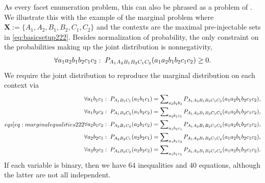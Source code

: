 {%

As every facet enumeration problem, this can also be phrased as a problem of . We illustrate this with the example of the marginal problem where $\bm{X} := \{ A_1, A_2, B_1, B_2, C_1, C_2\}$ and the contexts are the 
maximal pre-injectable sets in \cref{eq:basicsetup222}.
Besides normalization of probability, the only constraint on the probabilities making up the joint distribution is nonnegativity,
\begin{align}\label{eq:nonnegativity}
\forall{a_1 a_2 b_1 b_2 c_1 c_2}:\; \pdf[A_1 A_2 B_1 B_2 C_1 C_2]{a_1 a_2 b_1 b_2 c_1 c_2} \geq 0.
\end{align}
We require the joint distribution to reproduce the marginal distribution on each context via
\begin{align}\label[eqs]{eq:marginalequalities222}
\begin{split}
&\forall{a_1 b_1 c_1}:\;\pdf[A_1 B_1 C_1]{a_1 b_1 c_1} = \sum\nolimits_{a_2 b_2 b_2}\pdf[A_1 A_2 B_1 B_2 C_1 C_2]{a_1 a_2 b_1 b_2 c_1 c_2},\\
&\forall{a_1 b_2 c_2}:\;\pdf[A_1 B_2 C_2]{a_1 b_2 c_2} = \sum\nolimits_{a_2 b_1 c_1}\pdf[A_1 A_2 B_1 B_2 C_1 C_2]{a_1 a_2 b_1 b_2 c_1 c_2},\\
&\forall{a_2 b_1 c_2}:\;\pdf[A_2 B_1 C_2]{a_2 b_1 c_2} = \sum\nolimits_{a_1 b_2 c_1}\pdf[A_1 A_2 B_1 B_2 C_1 C_2]{a_1 a_2 b_1 b_2 c_1 c_2},\\
&\forall{a_2 b_2 c_1}:\;\pdf[A_2 B_2 C_1]{a_2 b_2 c_1} = \sum\nolimits_{a_1 b_1 c_2}\pdf[A_1 A_2 B_1 B_2 C_1 C_2]{a_1 a_2 b_1 b_2 c_1 c_2},\\
&\forall{a_2 b_2 c_2}:\;\pdf[A_2 B_2 C_2]{a_2 b_2 c_2} = \sum\nolimits_{a_1 b_1 c_1}\pdf[A_1 A_2 B_1 B_2 C_1 C_2]{a_1 a_2 b_1 b_2 c_1 c_2}.
\end{split}
\end{align}
If each variable is binary, then we have $64$ inequalities and $40$ equations, although the latter are not all independent. 

}
